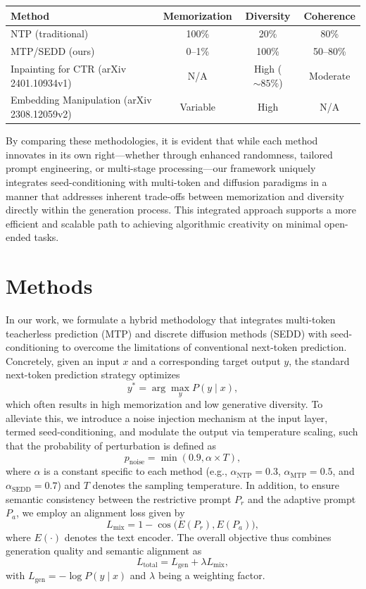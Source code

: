 \documentclass[11pt]{article}
\begin{document}
\begin{center}
\begin{tabular}{|l|c|c|c|}
\hline
Method & Memorization & Diversity & Coherence \\ \hline
NTP (traditional) & 100\% & 20\% & 80\% \\ \hline
MTP/SEDD (ours) & 0--1\% & 100\% & 50--80\% \\ \hline
Inpainting for CTR (arXiv 2401.10934v1) & N/A & High (\(\sim85\%\)) & Moderate \\ \hline
Embedding Manipulation (arXiv 2308.12059v2) & Variable & High & N/A \\ \hline
\end{tabular}
\end{center}

By comparing these methodologies, it is evident that while each method innovates in its own right—whether through enhanced randomness, tailored prompt engineering, or multi-stage processing—our framework uniquely integrates seed-conditioning with multi-token and diffusion paradigms in a manner that addresses inherent trade-offs between memorization and diversity directly within the generation process. This integrated approach supports a more efficient and scalable path to achieving algorithmic creativity on minimal open-ended tasks.

\section{Methods}
In our work, we formulate a hybrid methodology that integrates multi-token teacherless prediction (MTP) and discrete diffusion methods (SEDD) with seed-conditioning to overcome the limitations of conventional next-token prediction. Concretely, given an input \( x \) and a corresponding target output \( y \), the standard next-token prediction strategy optimizes
\[
y^* = \arg\max_{y} P(y \mid x),
\]
which often results in high memorization and low generative diversity. To alleviate this, we introduce a noise injection mechanism at the input layer, termed seed-conditioning, and modulate the output via temperature scaling, such that the probability of perturbation is defined as 
\[
p_{\text{noise}} = \min(0.9, \alpha \times T),
\]
where \( \alpha \) is a constant specific to each method (e.g., \( \alpha_{\text{NTP}}=0.3 \), \( \alpha_{\text{MTP}}=0.5 \), and \( \alpha_{\text{SEDD}}=0.7 \)) and \( T \) denotes the sampling temperature. In addition, to ensure semantic consistency between the restrictive prompt \( P_r \) and the adaptive prompt \( P_a \), we employ an alignment loss given by
\[
L_{\text{mix}} = 1 - \cos\big(E(P_r), E(P_a)\big),
\]
where \( E(\cdot) \) denotes the text encoder. The overall objective thus combines generation quality and semantic alignment as
\[
L_{\text{total}} = L_{\text{gen}} + \lambda L_{\text{mix}},
\]
with \( L_{\text{gen}} = -\log P(y\mid x) \) and \(\lambda\) being a weighting factor.
\end{document}
